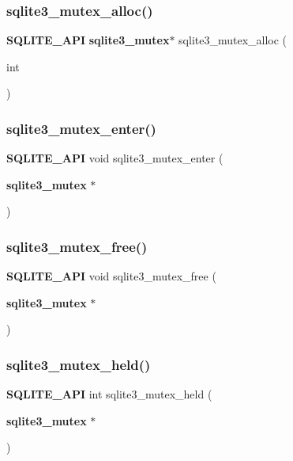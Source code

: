 \mbox{\label{sqlite3_8h_aa3f89418cd18e99596435c958b29b650}} 
\subsubsection{sqlite3\_mutex\_alloc()}
{\footnotesize\ttfamily \textbf{ S\+Q\+L\+I\+T\+E\+\_\+\+A\+PI} \textbf{ sqlite3\+\_\+mutex}$\ast$ sqlite3\+\_\+mutex\+\_\+alloc (\begin{DoxyParamCaption}\item[{int}]{ }\end{DoxyParamCaption})}

\mbox{\label{sqlite3_8h_a1c12cde690bd89f104de5cbad12a6bf5}} 
\subsubsection{sqlite3\_mutex\_enter()}
{\footnotesize\ttfamily \textbf{ S\+Q\+L\+I\+T\+E\+\_\+\+A\+PI} void sqlite3\+\_\+mutex\+\_\+enter (\begin{DoxyParamCaption}\item[{\textbf{ sqlite3\+\_\+mutex} $\ast$}]{ }\end{DoxyParamCaption})}

\mbox{\label{sqlite3_8h_a2db2e72e08f6873afa9c61b0ec726fec}} 
\subsubsection{sqlite3\_mutex\_free()}
{\footnotesize\ttfamily \textbf{ S\+Q\+L\+I\+T\+E\+\_\+\+A\+PI} void sqlite3\+\_\+mutex\+\_\+free (\begin{DoxyParamCaption}\item[{\textbf{ sqlite3\+\_\+mutex} $\ast$}]{ }\end{DoxyParamCaption})}

\mbox{\label{sqlite3_8h_acf77da68932b6bc163c5e68547ecc3e7}} 
\subsubsection{sqlite3\_mutex\_held()}
{\footnotesize\ttfamily \textbf{ S\+Q\+L\+I\+T\+E\+\_\+\+A\+PI} int sqlite3\+\_\+mutex\+\_\+held (\begin{DoxyParamCaption}\item[{\textbf{ sqlite3\+\_\+mutex} $\ast$}]{ }\end{DoxyParamCaption})}

